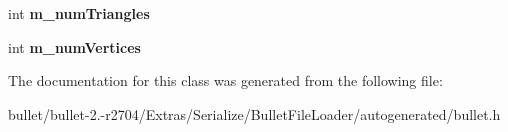 \begin{DoxyCompactItemize}
\item 
\hypertarget{class_bullet_1_1bt_mesh_part_data_a5e7dd900873356604433bd4ba387fb85}{int {\bfseries m\+\_\+num\+Triangles}}\label{class_bullet_1_1bt_mesh_part_data_a5e7dd900873356604433bd4ba387fb85}

\item 
\hypertarget{class_bullet_1_1bt_mesh_part_data_ad31de14f831e75323c245eddf247d405}{int {\bfseries m\+\_\+num\+Vertices}}\label{class_bullet_1_1bt_mesh_part_data_ad31de14f831e75323c245eddf247d405}

\end{DoxyCompactItemize}


The documentation for this class was generated from the following file\+:\begin{DoxyCompactItemize}
\item 
bullet/bullet-\/2.-\/r2704/\+Extras/\+Serialize/\+Bullet\+File\+Loader/autogenerated/bullet.\+h\end{DoxyCompactItemize}
